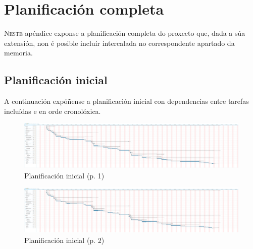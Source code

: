\chapter{Planificación completa}
\label{chap:planificacion-completa}


\lettrine{N}{este} apéndice exponse a planificación completa do proxecto que,
dada a súa extensión, non é posible incluír intercalada no correspondente
apartado da memoria.

\section{Planificación inicial}

A continuación expóñense a planificación inicial con dependencias entre tarefas
incluídas e en orde cronolóxica.

\begin{figure}
 \centering
 \includegraphics[trim=0 5cm 213cm 0,clip=true,scale=0.45,keepaspectratio=true]{./imagenes/planificacion-inicial.png}
 \caption{Planificación inicial (p. 1)}
 \label{figura:PlanificacionInicialCompleta1}
\end{figure}

\begin{figure}
 \centering
 \includegraphics[trim=29cm 5cm 181cm 0,clip=true,scale=0.45,keepaspectratio=true]{./imagenes/planificacion-inicial.png}
 \caption{Planificación inicial (p. 2)}
 \label{figura:PlanificacionInicialCompleta2}
\end{figure}

